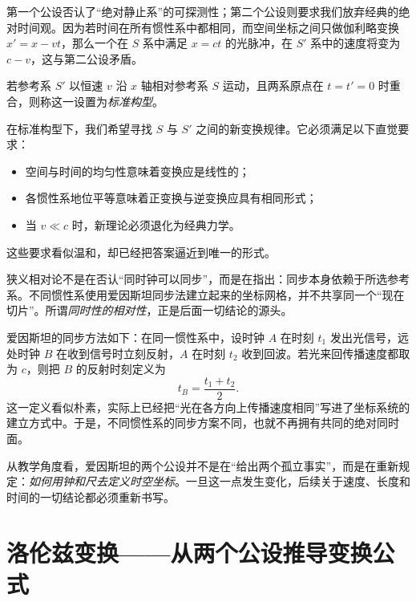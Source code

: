 第一个公设否认了“绝对静止系”的可探测性；第二个公设则要求我们放弃经典的绝对时间观。因为若时间在所有惯性系中都相同，而空间坐标之间只做伽利略变换 $x'=x-vt$，那么一个在 $S$ 系中满足 $x=ct$ 的光脉冲，在 $S'$ 系中的速度将变为 $c-v$，这与第二公设矛盾。

\begin{definition}
若参考系 $S'$ 以恒速 $v$ 沿 $x$ 轴相对参考系 $S$ 运动，且两系原点在 $t=t'=0$ 时重合，则称这一设置为\emph{标准构型}。
\end{definition}

在标准构型下，我们希望寻找 $S$ 与 $S'$ 之间的新变换规律。它必须满足以下直觉要求：
\begin{itemize}
  \item 空间与时间的均匀性意味着变换应是线性的；
  \item 各惯性系地位平等意味着正变换与逆变换应具有相同形式；
  \item 当 $v\ll c$ 时，新理论必须退化为经典力学。
\end{itemize}
这些要求看似温和，却已经把答案逼近到唯一的形式。

\begin{remark}
狭义相对论不是在否认“同时钟可以同步”，而是在指出：同步本身依赖于所选参考系。不同惯性系使用爱因斯坦同步法建立起来的坐标网格，并不共享同一个“现在切片”。所谓\emph{同时性的相对性}，正是后面一切结论的源头。
\end{remark}

爱因斯坦的同步方法如下：在同一惯性系中，设时钟 $A$ 在时刻 $t_1$ 发出光信号，远处时钟 $B$ 在收到信号时立刻反射，$A$ 在时刻 $t_2$ 收到回波。若光来回传播速度都取为 $c$，则把 $B$ 的反射时刻定义为
\[
 t_B=\frac{t_1+t_2}{2}.
\]
这一定义看似朴素，实际上已经把“光在各方向上传播速度相同”写进了坐标系统的建立方式中。于是，不同惯性系的同步方案不同，也就不再拥有共同的绝对同时面。

从教学角度看，爱因斯坦的两个公设并不是在“给出两个孤立事实”，而是在重新规定：\emph{如何用钟和尺去定义时空坐标}。一旦这一点发生变化，后续关于速度、长度和时间的一切结论都必须重新书写。

\section{洛伦兹变换——从两个公设推导变换公式}

